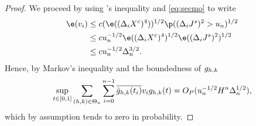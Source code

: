 \begin{proof}
    \begin{comment}
    where \begin{align} &v_n :=  2c H_n \Lambda n^{-1} \log(n) \sumin I_{\{(\djt)^2 > u_n\}} \notag \\ & w_n: = c H_n \sumin  (\djl)^2 I_{\{(\djt)^2 > u_n\}}\notag \end{align}  where $c$ is a sufficiently large constant, and $\Lambda$ is a finite-valued random variable satisfying  $\Lambda \ge  \sup_{t \in \domain} \vert b(t)\vert  + C $, where $C^{1/2}$ is the finite-valued random variable from Lemma \ref{lem:mylevy}.  Let  $\delta > 0$ be given, put  $x_n(t)  :=  \sumt\left(\sumin  \btghki(\dxf)^2 I_{A_i \cap B_i^c})\right)\ghk(t)$  and note that 
    \begin{align}
      \p &\left(  \sup_{t \in \domain}\vert x_n (t) \vert  > \delta\right) \le \p(v_n > \delta/2) + \p(w_n > \delta/2) \notag. 
      \label{}
    \end{align}
  Now let  $\varepsilon > 0$ be given and note that because  $\Lambda$ is almost surely finite,   there is a sufficiently large $K > 0$ such that $\p(\Lambda > K) \le \varepsilon/2$. Hence, 
\end{comment}
We  proceed by using \holder's inequality and \eqref{eq:secmo}   to write
\begin{align} 
  \e(v_i) & \le c (\e( (\dxc)^4))^{1/2} \p( (\djt)^2 > u_n)^{1/2} \notag \\ 
  & \le c u_n^{-1/2} \e( (\dxc)^4)^{1/2} \e( (\djt)^2)^{1/2} \notag \\ 
  & \le c u_n^{-1/2}\Delta_n^{3/2} \label{eq:vi}.
\end{align}
Hence,  by Markov's inequality and the boundedness of $g_{h,k}$ \begin{align} \sup_{t \in [0,1]}\sum_{(h,k) \in \Theta_n} \sum_{i = 0}^{n-1} \overline{\tilde{g}_{h,k}(t_i)} v_i g_{h,k}(t) = O_P(u_n^{-1/2}H^n \Delta_n^{1/2}),\end{align} 
which by assumption tends to zero in probability.


\end{proof}
